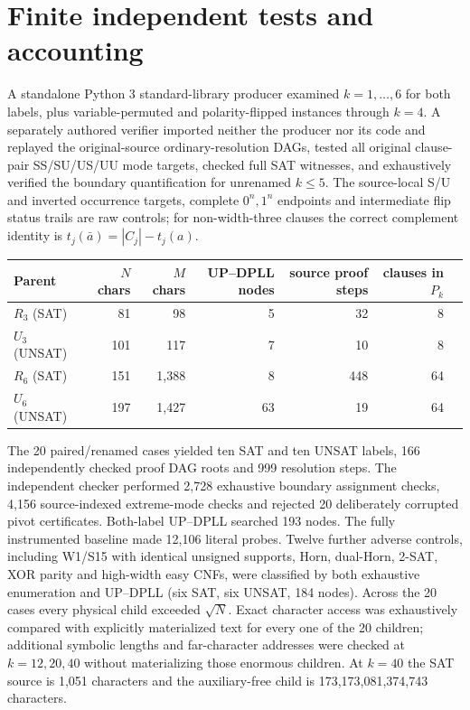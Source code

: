 \documentclass[11pt]{article}
\begin{document}
\section{Finite independent tests and accounting}
A standalone Python 3 standard-library producer examined $k=1,\ldots,6$ for both labels, plus variable-permuted and polarity-flipped instances through $k=4$. A separately authored verifier imported neither the producer nor its code and replayed the original-source ordinary-resolution DAGs, tested all original clause-pair SS/SU/US/UU mode targets, checked full SAT witnesses, and exhaustively verified the boundary quantification for unrenamed $k\le5$. The source-local S/U and inverted occurrence targets, complete $0^n,1^n$ endpoints and intermediate flip status trails are raw controls; for non-width-three clauses the correct complement identity is $t_j(\bar a)=|C_j|-t_j(a)$.

\begin{center}\small\begin{tabular}{lrrrrrr}\toprule
Parent & $N$ chars & $M$ chars & UP--DPLL nodes & source proof steps & clauses in $P_k$\\\midrule
$R_3$ (SAT)&81&98&5&32&8\\
$U_3$ (UNSAT)&101&117&7&10&8\\
$R_6$ (SAT)&151&1,388&8&448&64\\
$U_6$ (UNSAT)&197&1,427&63&19&64\\\bottomrule\end{tabular}\end{center}

The 20 paired/renamed cases yielded ten SAT and ten UNSAT labels, 166 independently checked proof DAG roots and 999 resolution steps. The independent checker performed 2,728 exhaustive boundary assignment checks, 4,156 source-indexed extreme-mode checks and rejected 20 deliberately corrupted pivot certificates. Both-label UP--DPLL searched 193 nodes. The fully instrumented baseline made 12,106 literal probes. Twelve further adverse controls, including W1/S15 with identical unsigned supports, Horn, dual-Horn, 2-SAT, XOR parity and high-width easy CNFs, were classified by both exhaustive enumeration and UP--DPLL (six SAT, six UNSAT, 184 nodes). Across the 20 cases every physical child exceeded $\sqrt N$. Exact character access was exhaustively compared with explicitly materialized text for every one of the 20 children; additional symbolic lengths and far-character addresses were checked at $k=12,20,40$ without materializing those enormous children. At $k=40$ the SAT source is 1,051 characters and the auxiliary-free child is 173,173,081,374,743 characters.
\end{document}
